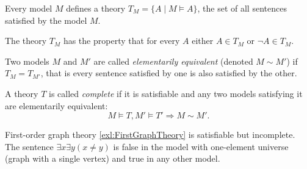 \begin{page}
\setcounter{section}{3}
\setcounter{subsection}{1}
\setcounter{dfn}{5}
\label{portion:671}

\begin{exl}
Every model $M$ defines a theory $T_M = \{A \mid M \vDash A\}$, the set of all sentences satisfied by the model $M$.
\end{exl}

\end{page}

\begin{page}
\setcounter{section}{3}
\setcounter{subsection}{1}
\setcounter{dfn}{5}
\label{portion:672}

The theory $T_M$ has the property that for every $A$ either $A \in T_M$ or $\neg A \in T_M$.



\end{page}

\begin{page}
\setcounter{section}{3}
\setcounter{subsection}{1}
\setcounter{dfn}{6}
\label{portion:674}

\begin{dfn}
Two models $M$ and $M'$ are called \emph{elementarily equivalent} (denoted $M \sim M'$) if $T_M = T_{M'}$, that is
every sentence satisfied by one is also satisfied by the other.
\end{dfn}

\end{page}

\begin{page}
\setcounter{section}{3}
\setcounter{subsection}{1}
\setcounter{dfn}{7}
\label{portion:677}

\begin{dfn}
A theory $T$ is called \emph{complete} if it is satisfiable and any two models satisfying it are elementarily equivalent:
\[
M \vDash T, M' \vDash T' \Rightarrow M \sim M'.
\]
\end{dfn}

\end{page}

\begin{page}
\setcounter{section}{3}
\setcounter{subsection}{1}
\setcounter{dfn}{8}
\label{portion:680}

\begin{exl}
First-order graph theory \ref{exl:FirstGraphTheory} is satisfiable but incomplete.
The sentence $\exists x \exists y (x \ne y)$ is false in the model with one-element universe (graph with a single vertex) and true in any other model.
\end{exl}

\end{page}

